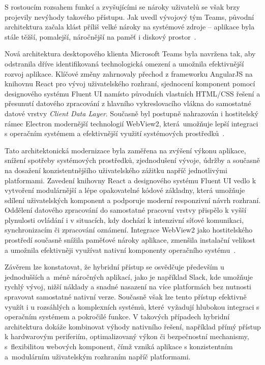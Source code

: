 S rostoucím rozsahem funkcí a zvyšujícími se nároky uživatelů se však brzy projevily nevýhody takového přístupu. Jak uvedl vývojový tým Teams, původní architektura začala klást příliš velké nároky na systémové zdroje -- aplikace byla stále těžší, pomalejší, náročnější na paměť i diskový prostor~\cite{Teams}.

Nová architektura desktopového klienta Microsoft Teams byla navržena tak, aby odstranila dříve identifikovaná technologická omezení a umožnila efektivnější rozvoj aplikace. Klíčové změny zahrnovaly přechod z frameworku AngularJS na knihovnu React pro vývoj uživatelského rozhraní, sjednocení komponent pomocí designového systému Fluent UI namísto původních vlastních HTML/CSS řešení a přesunutí datového zpracování z hlavního vykreslovacího vlákna do samostatné datové vrstvy \textit{Client Data Layer}. Současně byl postupně nahrazován i hostitelský rámec Electron modernější technologií WebView2, která~umožňuje lepší integraci s operačním systémem a efektivnější využití systémových prostředků~\cite{Teams}.

Tato architektonická modernizace byla zaměřena na zvýšení výkonu aplikace, snížení spotřeby systémových prostředků, zjednodušení vývoje, údržby a současně na dosažení konzistentnějšího uživatelského zážitku napříč jednotlivými platformami. Zavedení knihovny React a designového systému Fluent UI vedlo k vytvoření modulárnější a lépe opakovatelné kódové základny, která umožňuje sdílení uživatelských komponent a podporuje moderní responzivní návrh rozhraní. Oddělení datového zpracování do samostatné pracovní vrstvy přispělo k vyšší plynulosti ovládání i v situacích, kdy dochází k intenzivní síťové komunikaci, synchronizacím či zpracování oznámení. Integrace WebView2 jako hostitelského prostředí současně snížila paměťové nároky aplikace, zmenšila instalační velikost a umožnila efektivněji využívat nativní komponenty operačního systému~\cite{Teams}.

Závěrem lze konstatovat, že hybridní přístup se osvědčuje především u jednodušších a~méně náročných aplikací, jako je například Slack, kde umožňuje rychlý vývoj, nižší náklady a snadné nasazení na více platformách bez nutnosti spravovat samostatné nativní verze. Současně však lze tento přístup efektivně využít i u rozsáhlých a komplexních systémů, které~vyžadují hlubokou integraci s operačním systémem a pokročilé funkce. V takových případech hybridní architektura dokáže kombinovat výhody nativního řešení, například přímý přístup k hardwarovým periferiím, optimalizovaný výkon či bezpečnostní mechanismy, s~flexibilitou webových komponent, čímž vzniká aplikace s konzistentním a~modulárním uživatelským rozhraním napříč platformami.

